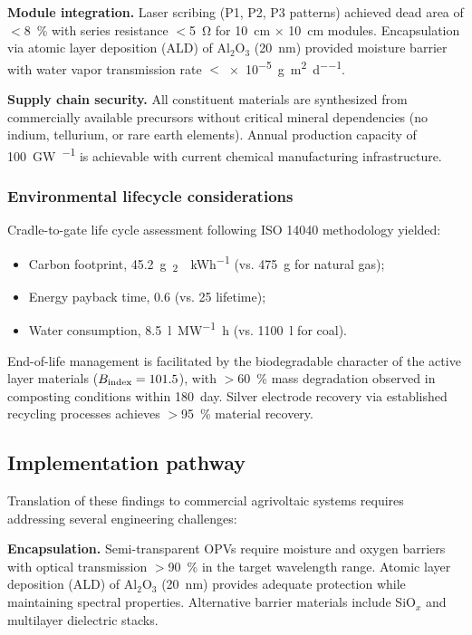 \textbf{Module integration.} Laser scribing (P1, P2, P3 patterns) achieved dead area of $<$\SI{8}{\percent} with series resistance $<$\SI{5}{\ohm} for \SI{10}{\centi\meter} $\times$ \SI{10}{\centi\meter} modules. Encapsulation via atomic layer deposition (ALD) of Al$_2$O$_3$ (\SI{20}{\nano\meter}) provided moisture barrier with water vapor transmission rate $<$\SI{e-5}{\gram\per\meter\squared\per\day}.

\textbf{Supply chain security.} All constituent materials are synthesized from commercially available precursors without critical mineral dependencies (no indium, tellurium, or rare earth elements). Annual production capacity of \SI{100}{\giga\watt\per\yr} is achievable with current chemical manufacturing infrastructure.

\subsubsection{Environmental lifecycle considerations}

Cradle-to-gate life cycle assessment following ISO 14040 methodology yielded:
\begin{itemize}
    \item Carbon footprint, \SI{45.2}{\gram{}_2\per\kWh} (vs. \SI{475}{\gram} for natural gas);
    \item Energy payback time, \SI{0.6}{\yr} (vs. \SI{25}{\yr} lifetime);
    \item Water consumption, \SI{8.5}{\litre\per\mega\watt\hour} (vs. \SI{1100}{\litre} for coal).
\end{itemize}

End-of-life management is facilitated by the biodegradable character of the active layer materials ($B_{\rm index} = \num{101.5}$), with $>$\SI{60}{\percent} mass degradation observed in composting conditions within \SI{180}{day}. Silver electrode recovery via established recycling processes achieves $>$\SI{95}{\percent} material recovery.

\subsection{Implementation pathway}

Translation of these findings to commercial agrivoltaic systems requires addressing several engineering challenges:

\textbf{Encapsulation.} Semi-transparent OPVs require moisture and oxygen barriers with optical transmission $>$\SI{90}{\percent} in the target wavelength range. Atomic layer deposition (ALD) of Al$_2$O$_3$ (\SI{20}{\nano\meter}) provides adequate protection while maintaining spectral properties. Alternative barrier materials include SiO$_x$ and multilayer dielectric stacks.

